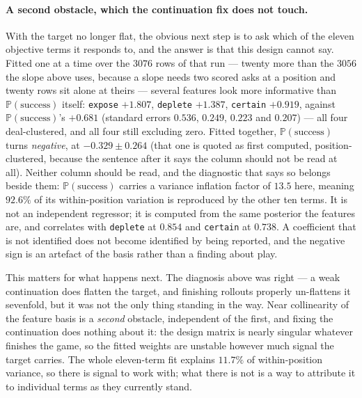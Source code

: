 \documentclass[11pt,letterpaper]{article}
\newcommand{\Prob}{\ensuremath{\mathbb{P}}}
\begin{document}
\paragraph{A second obstacle, which the continuation fix does not touch.} With
the target no longer flat, the obvious next step is to ask which of the eleven
objective terms it responds to, and the answer is that this design cannot say.
Fitted one at a time over the $3076$ rows of that run --- twenty more than the
$3056$ the slope above uses, because a slope needs two scored asks at a position
and twenty rows sit alone at theirs --- several features look
more informative than $\Prob(\text{success})$ itself: \texttt{expose}
$+1.807$, \texttt{deplete} $+1.387$, \texttt{certain} $+0.919$, against
$\Prob(\text{success})$'s $+0.681$ (standard errors $0.536$, $0.249$, $0.223$
and $0.207$) ---
all four deal-clustered, and all four still excluding zero. Fitted
together, $\Prob(\text{success})$ turns \emph{negative}, at
$-0.329 \pm 0.264$ (that one is quoted as first computed, position-clustered,
because the sentence after it says the column should not be read at all). Neither column should be read, and the diagnostic that says
so belongs beside them: $\Prob(\text{success})$ carries a variance inflation
factor of $\mathbf{13.5}$ here, meaning $92.6\%$ of its within-position variation
is reproduced by the other ten terms. It is not an independent regressor; it is
computed from the same posterior the features are, and correlates with
\texttt{deplete} at $0.854$ and \texttt{certain} at $0.738$. A coefficient that
is not identified does not become identified by being reported, and the negative
sign is an artefact of the basis rather than a finding about play.

This matters for what happens next. The diagnosis above was right --- a weak
continuation does flatten the target, and finishing rollouts properly un-flattens
it sevenfold, but it was not the only thing standing in the way. Near
collinearity of the feature basis is a \emph{second} obstacle, independent of the
first, and fixing the continuation does nothing about it: the design matrix is
nearly singular whatever finishes the game, so the fitted weights are unstable
however much signal the target carries. The whole eleven-term fit explains
$11.7\%$ of within-position variance, so there is signal to work with; what
there is not is a way to attribute it to individual terms as they currently
stand.
\end{document}
